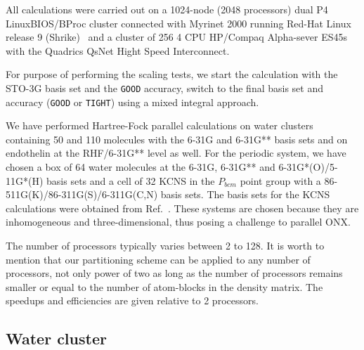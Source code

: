 \documentclass[prl,preprint,doublespace]{revtex4} %
\begin{document}
 All calculations were carried out on a 1024-node (2048 processors) 
 dual P4 LinuxBIOS/BProc cluster connected with Myrinet 2000 running
 Red-Hat Linux release 9 (Shrike)~\cite{RedHat90} and a cluster of 256 
 4 CPU HP/Compaq Alpha-sever ES45s with the Quadrics QsNet Hight Speed Interconnect. 

 For purpose of performing the scaling tests, we start the calculation 
 with the STO-3G basis set and the {\tt GOOD} accuracy, switch to
 the final basis set and accuracy ({\tt GOOD} or {\tt TIGHT}) using a mixed 
 integral approach. 

 We have performed Hartree-Fock parallel calculations on 
 water clusters containing 50 and 110 molecules with 
 the 6-31G and 6-31G** basis sets and on endothelin at the RHF/6-31G** level as well.
 For the periodic system, we have chosen a box of 64 water molecules
 at the 6-31G, 6-31G** and 6-31G*(O)/5-11G*(H) basis sets
 and a cell of 32 KCNS in the $P_{bcm}$ point group with
 a 86-511G(K)/86-311G(S)/6-311G(C,N) basis sets.
 The basis sets for the KCNS calculations were obtained from 
 Ref.~\cite{CrystalLib}.
 These systems are chosen because
 they are inhomogeneous and three-dimensional, thus posing a challenge
 to parallel ONX.

 The number of processors typically varies between 2 to 128. 
 It is worth to mention that our partitioning scheme can be 
 applied to any number of processors, not only power of two 
 as long as the number of processors remains smaller or equal 
 to the number of atom-blocks in the density matrix.
 The speedups and efficiencies are given relative to 2 processors.

\subsection{Water cluster}
\end{document}
